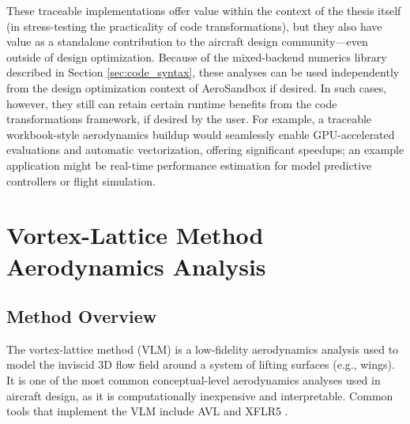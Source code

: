 These traceable implementations offer value within the context of the thesis itself (in stress-testing the practicality of code transformations), but they also have value as a standalone contribution to the aircraft design community—even outside of design optimization. Because of the mixed-backend numerics library described in Section \ref{sec:code_syntax}, these analyses can be used independently from the design optimization context of AeroSandbox if desired. In such cases, however, they still can retain certain runtime benefits from the code transformations framework, if desired by the user. For example, a traceable workbook-style aerodynamics buildup would seamlessly enable GPU-accelerated evaluations and automatic vectorization, offering significant speedups; an example application might be real-time performance estimation for model predictive controllers or flight simulation.


\section{Vortex-Lattice Method Aerodynamics Analysis}
\label{sec:vlm}

\subsection{Method Overview}
\label{sec:vlm_theory}

The vortex-lattice method (VLM) is a low-fidelity aerodynamics analysis used to model the inviscid 3D flow field around a system of lifting surfaces (e.g., wings). It is one of the most common conceptual-level aerodynamics analyses used in aircraft design, as it is computationally inexpensive and interpretable. Common tools that implement the VLM include AVL \cite{avl} and XFLR5 \cite{xflr5}.

